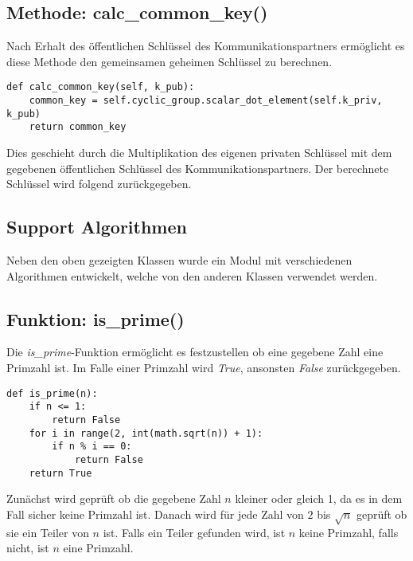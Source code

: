 \subsection{Methode: calc\_common\_key()}
Nach Erhalt des öffentlichen Schlüssel des Kommunikationspartners ermöglicht es diese Methode den gemeinsamen geheimen Schlüssel zu berechnen.

\vspace{\baselineskip}
\begin{lstlisting}[caption={Methode: calc\_common\_key()}, captionpos=b]
def calc_common_key(self, k_pub):
	common_key = self.cyclic_group.scalar_dot_element(self.k_priv, k_pub)
	return common_key
\end{lstlisting}
\vspace{\baselineskip}
Dies geschieht durch die Multiplikation des eigenen privaten Schlüssel mit dem gegebenen öffentlichen Schlüssel des Kommunikationspartners. Der berechnete Schlüssel wird folgend zurückgegeben.

\subsection{Support Algorithmen}
Neben den oben gezeigten Klassen wurde ein Modul mit verschiedenen Algorithmen entwickelt, welche von den anderen Klassen verwendet werden.

\subsection{Funktion: is\_prime()}
Die \textit{is\_prime}-Funktion ermöglicht es festzustellen ob eine gegebene Zahl eine Primzahl ist. Im Falle einer Primzahl wird \textit{True}, ansonsten \textit{False} zurückgegeben.
\vspace{\baselineskip}
\begin{lstlisting}[caption={Funktion: is\_prime()}, captionpos=b]
def is_prime(n):
    if n <= 1:
        return False
    for i in range(2, int(math.sqrt(n)) + 1):
        if n % i == 0:
            return False
    return True
\end{lstlisting}
\vspace{\baselineskip}
Zunächst wird geprüft ob die gegebene Zahl $n$ kleiner oder gleich 1, da es in dem Fall sicher keine Primzahl ist. Danach wird für jede Zahl von $2$ bis $\sqrt{n}$ geprüft ob sie ein Teiler von $n$ ist. Falls ein Teiler gefunden wird, ist $n$ keine Primzahl, falls nicht, ist $n$ eine Primzahl.

